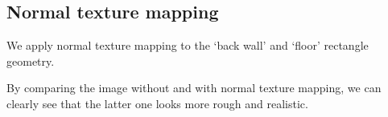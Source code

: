 \documentclass[acmtog]{acmart}
\begin{document}
\begin{figure}[h]
	\centering
\end{figure}

\newpage

\subsection{Normal texture mapping}

We apply normal texture mapping to the `back wall' and `floor' rectangle geometry. 

By comparing the image without and with normal texture mapping, we can clearly see that the latter one looks more rough and realistic.
\end{document}
